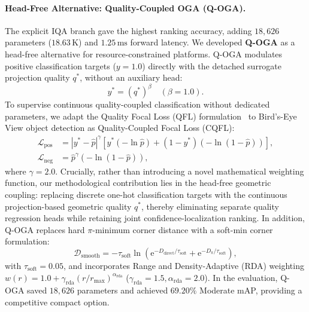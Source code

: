 \paragraph{Head-Free Alternative: Quality-Coupled OGA (Q-OGA).}
The explicit IQA branch gave the highest ranking accuracy, adding $18{,}626$ parameters ($18.63\,\text{K}$) and $1.25\,\text{ms}$ forward latency. We developed \textbf{Q-OGA} as a head-free alternative for resource-constrained platforms. Q-OGA modulates positive classification targets ($y=1.0$) directly with the detached surrogate projection quality $q^*$, without an auxiliary head:
\begin{equation}
    y^* = (q^*)^\beta \quad (\beta = 1.0).
    \label{eq:cqfl_target}
\end{equation}
To supervise continuous quality-coupled classification without dedicated parameters, we adapt the Quality Focal Loss (QFL) formulation~\cite{li2020gfl} to Bird's-Eye View object detection as Quality-Coupled Focal Loss (CQFL):
\begin{align}
    \mathcal{L}_{\mathrm{pos}} &= |y^* - \hat{p}|^\gamma \left[ y^* (-\ln \hat{p}) + (1 - y^*) (-\ln(1 - \hat{p})) \right], \nonumber\\
    \mathcal{L}_{\mathrm{neg}} &= \hat{p}^\gamma (-\ln(1 - \hat{p})),
    \label{eq:cqfl_loss}
\end{align}
where $\gamma = 2.0$. Crucially, rather than introducing a novel mathematical weighting function, our methodological contribution lies in the head-free geometric coupling: replacing discrete one-hot classification targets with the continuous projection-based geometric quality $q^*$, thereby eliminating separate quality regression heads while retaining joint confidence-localization ranking. In addition, Q-OGA replaces hard $\pi$-minimum corner distance with a soft-min corner formulation:
\begin{equation}
    \mathcal{D}_{\mathrm{smooth}} = -\tau_{\mathrm{soft}} \ln\left( \mathrm{e}^{-D_{\mathrm{direct}}/\tau_{\mathrm{soft}}} + \mathrm{e}^{-D_\pi/\tau_{\mathrm{soft}}} \right),
    \label{eq:softmin_corner}
\end{equation}
with $\tau_{\mathrm{soft}} = 0.05$, and incorporates Range and Density-Adaptive (RDA) weighting $w(r) = 1.0 + \gamma_{\mathrm{rda}}(r / r_{\max})^{\alpha_{\mathrm{rda}}}$ ($\gamma_{\mathrm{rda}} = 1.5, \alpha_{\mathrm{rda}} = 2.0$). In the evaluation, Q-OGA saved $18{,}626$ parameters and achieved $69.20\%$ Moderate mAP, providing a competitive compact option.

